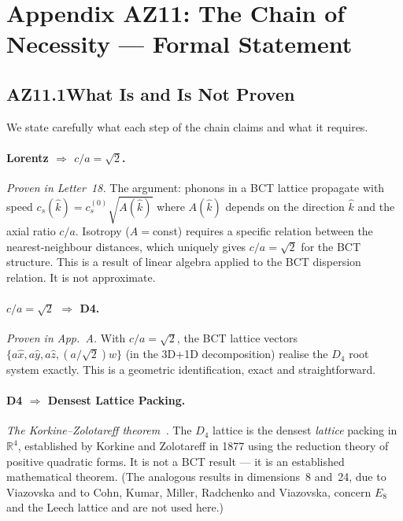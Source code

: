 \documentclass[aps,prl,twocolumn,showpacs,preprintnumbers]{revtex4-2}
\begin{document}
\clearpage
\appendix

\section*{Appendix AZ11: The Chain of Necessity — Formal Statement}
\setcounter{equation}{0}
\renewcommand{\theequation}{AZ11.\arabic{equation}}

\subsection*{AZ11.1\quad What Is and Is Not Proven}

We state carefully what each step of the chain claims and
what it requires.

\paragraph{Lorentz $\Rightarrow$ $c/a=\sqrt{2}$.}
\textit{Proven in Letter~18.} The argument: phonons in a BCT
lattice propagate with speed $c_s(\hat{k}) = c_s^{(0)}\sqrt{A(\hat{k})}$
where $A(\hat{k})$ depends on the direction $\hat{k}$ and the
axial ratio $c/a$. Isotropy ($A = $const) requires a specific
relation between the nearest-neighbour distances, which uniquely
gives $c/a = \sqrt{2}$ for the BCT structure.
This is a result of linear algebra applied to the BCT dispersion
relation. It is not approximate.

\paragraph{$c/a = \sqrt{2}$ $\Rightarrow$ D4.}
\textit{Proven in App.~A.} With $c/a = \sqrt{2}$, the BCT lattice
vectors $\{a\hat{x}, a\hat{y}, a\hat{z}, (a/\sqrt{2})\hat{w}\}$
(in the 3D+1D decomposition) realise the $D_4$ root system exactly.
This is a geometric identification, exact and straightforward.

\paragraph{D4 $\Rightarrow$ Densest Lattice Packing.}
\textit{The Korkine--Zolotareff theorem~\cite{korkine}.}
The $D_4$ lattice is the densest \emph{lattice} packing in
$\mathbb{R}^4$, established by Korkine and Zolotareff in 1877 using
the reduction theory of positive quadratic forms. It is not a BCT
result --- it is an established mathematical theorem. (The analogous
results in dimensions~8 and~24, due to Viazovska and to Cohn, Kumar,
Miller, Radchenko and Viazovska, concern $E_8$ and the Leech lattice
and are not used here.)
\end{document}
